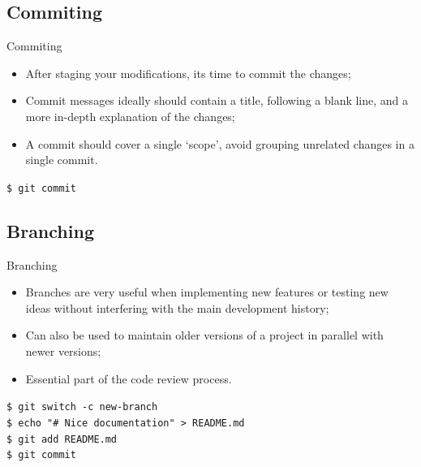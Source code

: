 \documentclass{beamer}
\begin{document}
\subsection{Commiting}
\begin{frame}{Commiting}
  \begin{itemize}
    \item After staging your modifications, its time to commit the changes;
    \item Commit messages ideally should contain a title, following a blank line, and a more in-depth explanation of the changes;
    \item A commit should cover a single `scope', avoid grouping unrelated changes in a single commit.
  \end{itemize}
  \begin{block}{}
    \texttt{\$ git commit}
  \end{block}
  \begin{scriptsize}
    
  \end{scriptsize}
\end{frame}

\subsection{Branching}
\begin{frame}{Branching}
  \begin{itemize}
    \item Branches are very useful when implementing new features or testing new ideas without interfering with the main development history;
    \item Can also be used to maintain older versions of a project in parallel with newer versions;
    \item Essential part of the code review process.
  \end{itemize}
  \begin{block}{}
    \texttt{\$ git switch -c new-branch} \\
    \texttt{\$ echo "\# Nice documentation" > README.md} \\
    \texttt{\$ git add README.md} \\
    \texttt{\$ git commit}
  \end{block}
\end{frame}
\end{document}
